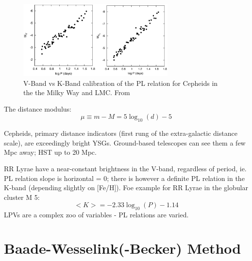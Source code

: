 \documentclass{spy}
\begin{document}
\begin{figure}[ht]
    \centering
    \includegraphics[width=0.7\textwidth]{fouque_cepheid.eps}
    \caption{V-Band vs K-Band calibration of the PL relation for Cepheids in the the Milky Way and LMC. From \citet{fouqueNewCalibrationGalactic2007}}   
    \label{fouque_cepheid}
\end{figure}

The distance modulus:
\begin{equation}
    \mu \equiv m-M = 5\log_\mathrm{10}(d) - 5
\end{equation}

Cepheids, primary distance indicators (first rung of the extra-galactic distance scale), are exceedingly bright YSGs. Ground-based telescopes can see them a few Mpc away; HST up to 20 Mpc. 

RR Lyrae have a near-constant brightness in the V-band, regardless of period, ie. PL relation slope is horizontal = 0; there is however a definite PL relation in the K-band (depending slightly on [Fe/H]). Foe example for RR Lyrae in the globular cluster M 5:
\begin{equation}
    <K>=-2.33\log_\mathrm{10}(P)-1.14
\end{equation}
LPVs are a complex zoo of variables - PL relations are varied. 

\section{Baade-Wesselink(-Becker) Method}
\end{document}
